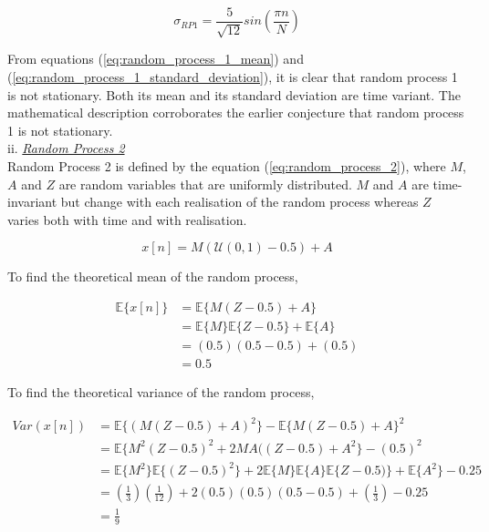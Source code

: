 \documentclass{article}
\begin{document}
\begin{equation}
    \sigma_{RP1} = \frac{5}{\sqrt{12}}sin(\frac{\pi n}{N})\label{eq:random_process_1_standard_deviation}
\end{equation}

From equations (\ref{eq:random_process_1_mean}) and (\ref{eq:random_process_1_standard_deviation}), it is clear that random process 1 is not stationary. Both its mean and its standard deviation are time variant. The mathematical description corroborates the earlier conjecture that random process 1 is not stationary.\\ 

ii. \textit{\underline{Random Process 2}}\\

Random Process 2 is defined by the equation (\ref{eq:random_process_2}), where $M$, $A$ and $Z$ are random variables that are uniformly distributed. $M$ and $A$ are time-invariant but change with each realisation of the random process whereas $Z$ varies both with time and with realisation.

\begin{equation}\label{eq:random_process_2}
    x[n] = M(\mathcal{U}(0,1)-0.5) + A
\end{equation}

To find the theoretical mean of the random process,

\begin{align}
    \mathbb{E}\{x[n]\}  &= \mathbb{E}\{M(Z-0.5) + A\}\nonumber\\
                        &= \mathbb{E}\{M\}\mathbb{E}\{Z-0.5\} + \mathbb{E}\{A\}\nonumber\\
                        &= (0.5)(0.5-0.5) + (0.5)\nonumber\\
                        &= 0.5 \label{eq:random_process_2_mean}
\end{align}

To find the theoretical variance of the random process,

\begin{align}
    Var(x[n])   &= \mathbb{E}\{(M(Z-0.5) + A)^{2}\} - \mathbb{E}\{ M(Z-0.5) + A\}^{2}\nonumber\\
                &= \mathbb{E}\{M^{2}(Z-0.5)^{2} + 2MA((Z-0.5) + A^{2}\} - (0.5)^{2}\nonumber\\
                &= \mathbb{E}\{M^{2}\}\mathbb{E}\{(Z-0.5)^{2}\}+2\mathbb{E}\{M\}\mathbb{E}\{A\}\mathbb{E}\{Z-0.5)\}+\mathbb{E}\{A^{2}\} - 0.25\nonumber\\
                &= (\frac{1}{3})(\frac{1}{12})+2(0.5)(0.5)(0.5-0.5)+(\frac{1}{3}) - 0.25\nonumber\\
                &= \frac{1}{9}\nonumber
\end{align}
\end{document}
